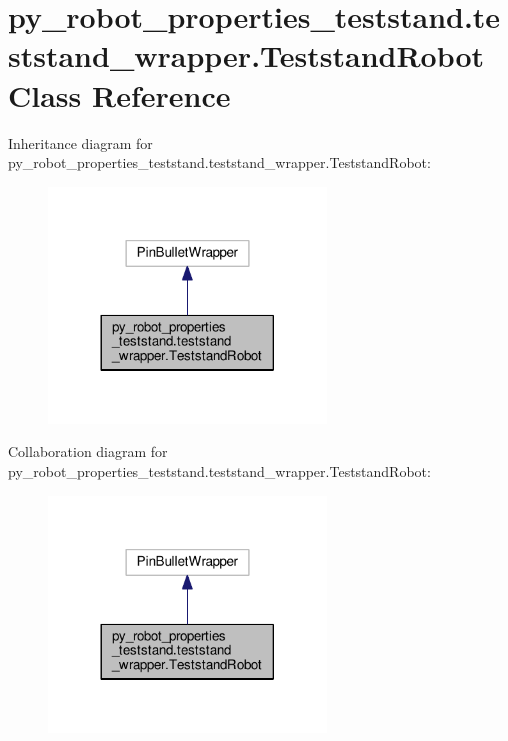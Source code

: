 \hypertarget{classpy__robot__properties__teststand_1_1teststand__wrapper_1_1TeststandRobot}{}\section{py\+\_\+robot\+\_\+properties\+\_\+teststand.\+teststand\+\_\+wrapper.\+Teststand\+Robot Class Reference}
\label{classpy__robot__properties__teststand_1_1teststand__wrapper_1_1TeststandRobot}


Inheritance diagram for py\+\_\+robot\+\_\+properties\+\_\+teststand.\+teststand\+\_\+wrapper.\+Teststand\+Robot\+:
\nopagebreak
\begin{figure}[H]
\begin{center}
\leavevmode
\includegraphics[width=209pt]{classpy__robot__properties__teststand_1_1teststand__wrapper_1_1TeststandRobot__inherit__graph}
\end{center}
\end{figure}


Collaboration diagram for py\+\_\+robot\+\_\+properties\+\_\+teststand.\+teststand\+\_\+wrapper.\+Teststand\+Robot\+:
\nopagebreak
\begin{figure}[H]
\begin{center}
\leavevmode
\includegraphics[width=209pt]{classpy__robot__properties__teststand_1_1teststand__wrapper_1_1TeststandRobot__coll__graph}
\end{center}
\end{figure}
